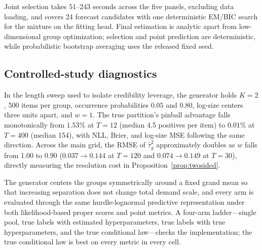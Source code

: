 Joint selection takes $51$--$243$ seconds across the five panels,
excluding data loading, and covers 24 forecast candidates with one
deterministic EM/BIC search for the mixture on the fitting head. Final
estimation is analytic apart from low-dimensional group optimization;
selection and point prediction are deterministic, while probabilistic
bootstrap averaging uses the released fixed seed.

\subsection{Controlled-study diagnostics}
\label{app:simulation-details}

In the length sweep used to isolate credibility leverage, the generator
holds $K=2$, 500 items per group, occurrence probabilities $0.05$ and
$0.80$, log-size centers three units apart, and $w=1$. The true
partition's pinball advantage falls monotonically from $1.53\%$ at
$T=12$ (median 4.5 positives per item) to $0.01\%$ at $T=400$ (median
154), with NLL, Brier, and log-size MSE following the same direction.
Across the main grid, the RMSE of $\hat\tau_g^2$ approximately doubles
as $w$ falls from $1.00$ to $0.90$ ($0.037\to0.144$ at $T=120$ and
$0.074\to0.149$ at $T=30$), directly measuring the resolution cost in
Proposition~\ref{prop:twosided}.

The generator centers the groups symmetrically around a fixed grand mean
so that increasing separation does not change total demand scale, and
every arm is evaluated through the same hurdle-lognormal predictive
representation under both likelihood-based proper scores and point
metrics. A four-arm ladder---single pool, true labels with estimated
hyperparameters, true labels with true hyperparameters, and the true
conditional law---checks the implementation; the true conditional law is
best on every metric in every cell.
